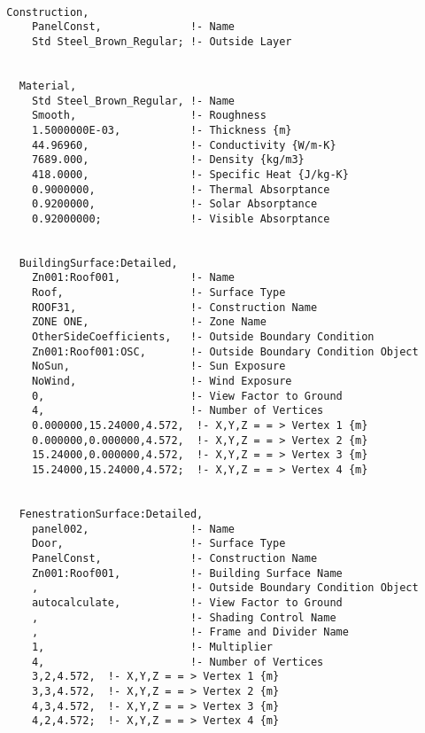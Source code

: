 \begin{lstlisting}

  Construction,
      PanelConst,              !- Name
      Std Steel_Brown_Regular; !- Outside Layer


    Material,
      Std Steel_Brown_Regular, !- Name
      Smooth,                  !- Roughness
      1.5000000E-03,           !- Thickness {m}
      44.96960,                !- Conductivity {W/m-K}
      7689.000,                !- Density {kg/m3}
      418.0000,                !- Specific Heat {J/kg-K}
      0.9000000,               !- Thermal Absorptance
      0.9200000,               !- Solar Absorptance
      0.92000000;              !- Visible Absorptance


    BuildingSurface:Detailed,
      Zn001:Roof001,           !- Name
      Roof,                    !- Surface Type
      ROOF31,                  !- Construction Name
      ZONE ONE,                !- Zone Name
      OtherSideCoefficients,   !- Outside Boundary Condition
      Zn001:Roof001:OSC,       !- Outside Boundary Condition Object
      NoSun,                   !- Sun Exposure
      NoWind,                  !- Wind Exposure
      0,                       !- View Factor to Ground
      4,                       !- Number of Vertices
      0.000000,15.24000,4.572,  !- X,Y,Z = = > Vertex 1 {m}
      0.000000,0.000000,4.572,  !- X,Y,Z = = > Vertex 2 {m}
      15.24000,0.000000,4.572,  !- X,Y,Z = = > Vertex 3 {m}
      15.24000,15.24000,4.572;  !- X,Y,Z = = > Vertex 4 {m}


    FenestrationSurface:Detailed,
      panel002,                !- Name
      Door,                    !- Surface Type
      PanelConst,              !- Construction Name
      Zn001:Roof001,           !- Building Surface Name
      ,                        !- Outside Boundary Condition Object
      autocalculate,           !- View Factor to Ground
      ,                        !- Shading Control Name
      ,                        !- Frame and Divider Name
      1,                       !- Multiplier
      4,                       !- Number of Vertices
      3,2,4.572,  !- X,Y,Z = = > Vertex 1 {m}
      3,3,4.572,  !- X,Y,Z = = > Vertex 2 {m}
      4,3,4.572,  !- X,Y,Z = = > Vertex 3 {m}
      4,2,4.572;  !- X,Y,Z = = > Vertex 4 {m}



\end{lstlisting}
